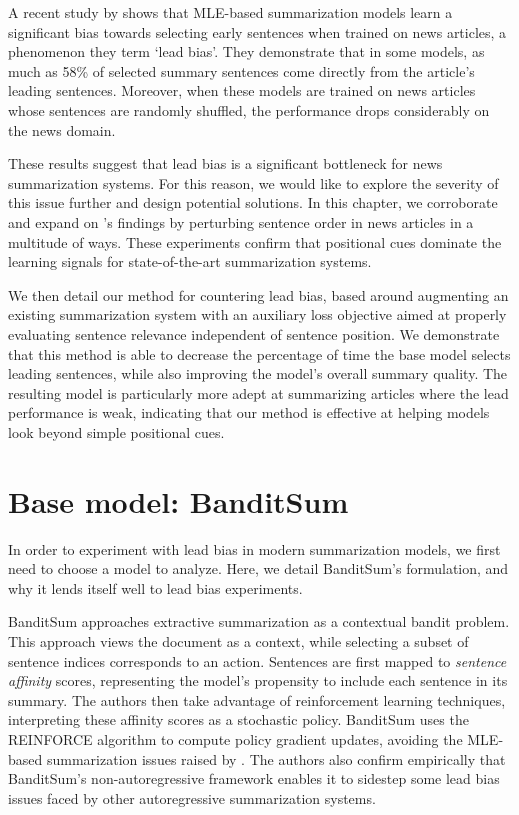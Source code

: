 A recent study by \cite{kedzie2018content} shows that MLE-based summarization models learn a significant bias towards selecting early sentences when trained on news articles, a phenomenon they term `lead bias'. They demonstrate that in some models, as much as 58\% of selected summary sentences come directly from the article's leading sentences. Moreover, when these models are trained on news articles whose sentences are randomly shuffled, the performance drops considerably on the news domain.

These results suggest that lead bias is a significant bottleneck for news summarization systems. For this reason, we would like to explore the severity of this issue further and design potential solutions. In this chapter, we corroborate and expand on \cite{kedzie2018content}'s findings by perturbing sentence order in news articles in a multitude of ways. These experiments confirm that positional cues dominate the learning signals for state-of-the-art summarization systems.

We then detail our method for countering lead bias, based around augmenting an existing summarization system with an auxiliary loss objective aimed at properly evaluating sentence relevance independent of sentence position. We demonstrate that this method is able to decrease the percentage of time the base model selects leading sentences, while also improving the model's overall summary quality. The resulting model is particularly more adept at summarizing articles where the lead performance is weak, indicating that our method is effective at helping models look beyond simple positional cues.

\section{Base model: BanditSum}
In order to experiment with lead bias in modern summarization models, we first need to choose a model to analyze. Here, we detail BanditSum's formulation, and why it lends itself well to lead bias experiments.

BanditSum approaches extractive summarization as a contextual bandit problem. This approach views the document as a context, while selecting a subset of sentence indices corresponds to an action. Sentences are first mapped to \textit{sentence affinity} scores, representing the model's propensity to include each sentence in its summary. The authors then take advantage of reinforcement learning techniques, interpreting these affinity scores as a stochastic policy. BanditSum uses the REINFORCE algorithm \parencite{williams1992simple} to compute policy gradient updates, avoiding the MLE-based summarization issues raised by \cite{DBLP:Narayan/2018}. The authors also confirm empirically that BanditSum's non-autoregressive framework enables it to sidestep some lead bias issues faced by other autoregressive summarization systems.

